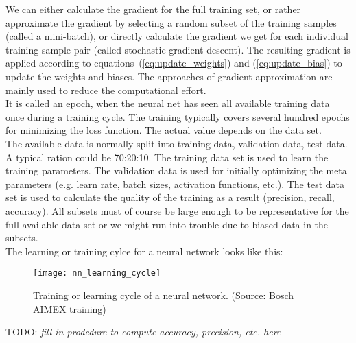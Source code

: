 We can either calculate the gradient for the full training set, or rather approximate the
gradient by selecting a random subset of the training samples (called a mini-batch), or
directly calculate the gradient we get for each individual training sample pair (called
stochastic gradient descent). The resulting gradient is applied according to
equations~(\ref{eq:update_weights}) and (\ref{eq:update_bias}) to update the weights and
biases. The approaches of gradient approximation are mainly used to reduce the
computational effort. \\

It is called an epoch, when the neural net has seen all available training data once
during a training cycle. The training typically covers several hundred epochs for
minimizing the loss function. The actual value depends on the data set. \\

The available data is normally split into training data, validation data, test data. A
typical ration could be 70:20:10. The training data set is used to learn the training
parameters. The validation data is used for initially optimizing the meta parameters (e.g.
learn rate, batch sizes, activation functions, etc.). The test data set is used to
calculate the quality of the training as a result (precision, recall, accuracy). All
subsets must of course be large enough to be representative for the full available data
set or we might run into trouble due to biased data in the subsets. \\

The learning or training cylce for a neural network looks like this:
\begin{figure}[h] \centering \texttt{[image: nn\_learning\_cycle]}
    \caption{Training or learning cycle of a neural network.
    (Source: Bosch AIMEX training)}
    \label{fig:training_cycle}
\end{figure}

TODO: \emph{fill in prodedure to compute accuracy, precision, etc. here}

\newpage
